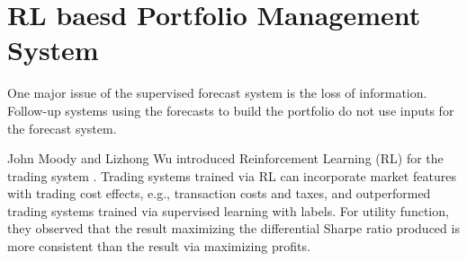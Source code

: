 \section{RL baesd Portfolio Management System}
One major issue of the supervised forecast system is the loss of information. Follow-up systems using the forecasts to build the portfolio do not use inputs for the forecast system.
\par
John Moody and Lizhong Wu introduced Reinforcement Learning (RL) for the trading system \cite{618952}. Trading systems trained via RL can incorporate market features with trading cost effects, e.g., transaction costs and taxes, and outperformed trading systems trained via supervised learning with labels. For utility function, they observed that the result maximizing the differential Sharpe ratio produced is more consistent than the result via maximizing profits\cite{618952}.